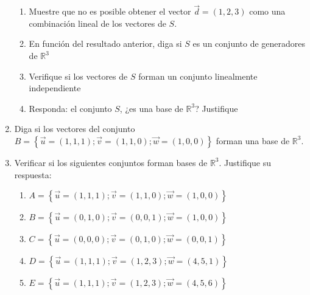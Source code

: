 \documentclass[a4paper,12pt]{article}
\begin{document}
\begin{enumerate}
    \begin{enumerate}
      \item Muestre que no es posible obtener el vector $\vec d = (1,2,3)$ como una combinación lineal de los vectores de $S$.
      \item En función del resultado anterior, diga si $S$ es un conjunto de generadores de $\mathbb R^3$
      \item Verifique si los vectores de $S$ forman un conjunto linealmente independiente
      \item Responda: el conjunto $S$, ¿es una base de $\mathbb R^3$? Justifique
    \end{enumerate}
  \item Diga si los vectores del conjunto $B=\left \{\vec u=(1,1,1); \vec v=(1,1,0); \vec w=(1,0,0) \right \}$ forman una base de $\mathbb R^3$.
  \item Verificar si los siguientes conjuntos forman bases de $\mathbb R^3$. Justifique su respuesta: 
    \begin{enumerate}
      \item $A=\left \{\vec u=(1,1,1);\vec v=(1,1,0);\vec w=(1,0,0) \right \}$
      \item $B=\left \{\vec u=(0,1,0);\vec v=(0,0,1);\vec w=(1,0,0) \right \}$
      \item $C=\left \{\vec u=(0,0,0);\vec v=(0,1,0);\vec w=(0,0,1) \right \}$
      \item $D=\left \{\vec u=(1,1,1);\vec v=(1,2,3);\vec w=(4,5,1) \right \}$
      \item $E=\left \{\vec u=(1,1,1);\vec v=(1,2,3);\vec w=(4,5,6) \right \}$
    \end{enumerate}
\end{enumerate}
\end{document}
